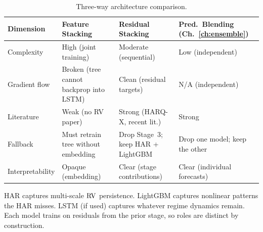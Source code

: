 \begin{table}[htbp]
\centering
\caption{Three-way architecture comparison.}
\label{tab:architecture-comparison}
\small
\begin{tabular}{@{}lp{3.2cm}p{3.2cm}p{3.8cm}@{}}
\toprule
\textbf{Dimension} & \textbf{Feature Stacking} & \textbf{Residual Stacking} & \textbf{Pred.\ Blending (Ch.~\ref{ch:ensemble})} \\
\midrule
Complexity &
  High (joint training) &
  Moderate (sequential) &
  Low (independent) \\[6pt]
Gradient flow &
  Broken (tree cannot backprop into LSTM) &
  Clean (residual targets) &
  N/A (independent) \\[6pt]
Literature &
  Weak (no RV paper) &
  Strong (HARQ-X, recent lit.) &
  Strong \citep{Optiver2021, Bucci2020} \\[6pt]
Fallback &
  Must retrain tree without embedding &
  Drop Stage~3; keep HAR + LightGBM &
  Drop one model; keep the other \\[6pt]
Interpretability &
  Opaque (embedding) &
  Clear (stage contributions) &
  Clear (individual forecasts) \\
\bottomrule
\end{tabular}
\end{table}



\begin{keyidea}
HAR captures multi-scale $\operatorname{RV}$ persistence.
LightGBM captures nonlinear patterns the HAR misses.
LSTM (if used) captures whatever regime dynamics remain.
Each model trains on residuals from the prior stage, so roles are distinct by construction.
\end{keyidea}

